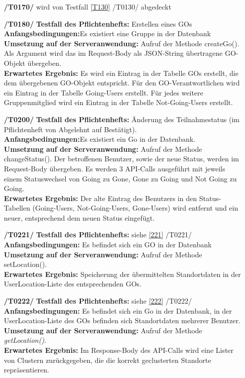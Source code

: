 \documentclass[11pt,a4paper]{scrartcl}
\begin{document}
\begin{enumerate}
	\item[\textbf{/T0170/}] wird von Testfall \ref{T130} /T0130/ abgedeckt
	
	\item[\textbf{/T0180/}]
	\textbf{Testfall des Pflichtenhefts: }Erstellen eines GOs\\
	\textbf{Anfangsbedingungen:}Es existiert eine Gruppe in der Datenbank\\
	\textbf{Umsetzung auf der Serveranwendung: }Aufruf der Methode createGo(). Als Argument wird das im Request-Body als JSON-String übertragene GO-Objekt übergeben.\\
	\textbf{Erwartetes Ergebnis: }Es wird ein Eintrag in der Tabelle GOs erstellt, die dem übergebenen GO-Objekt entspricht. Für den GO-Verantwortlichen wird ein Eintrag in der Tabelle Going-Users erstellt. Für jedes weitere Gruppenmitglied wird ein Eintrag in der Tabelle Not-Going-Users erstellt.
	
	\item[\textbf{/T0200/}]
	\textbf{Testfall des Pflichtenhefts: }Änderung des Teilnahmestatus (im Pflichtenheft von Abgelehnt auf Bestätigt).\\
	\textbf{Anfangsbedingungen:}Es existiert ein Go in der Datenbank.\\
	\textbf{Umsetzung auf der Serveranwendung: }Aufruf der Methode changeStatus(). Der betroffenen Benutzer, sowie der neue Status, werden im Request-Body übergeben. Es werden 3 API-Calls ausgeführt mit jeweils einem Statuswechsel von Going zu Gone, Gone zu Going und Not Going zu Going.\\
	\textbf{Erwartetes Ergebnis: }Der alte Eintrag des Benutzers in den Status-Tabellen (Going-Users, Not-Going-Users, Gone-Users) wird entfernt und ein neuer, entsprechend dem neuen Status eingefügt.
	
	\item[\textbf{/T0221/}]
	\textbf{Testfall des Pflichtenhefts: }siehe \ref{221} /T0221/\\
	\textbf{Anfangsbedingungen: }Es befindet sich ein GO in der Datenbank\\
	\textbf{Umsetzung auf der Serveranwendung: }Aufruf der Methode setLocation().\\
	\textbf{Erwartetes Ergebnis: }Speicherung der übermittelten Standortdaten in der UserLocation-Liste des entsprechenden GOs.
	
	\item[\textbf{/T0222/}]
	\textbf{Testfall des Pflichtenhefts: }siehe \ref{222} /T0222/\\
	\textbf{Anfangsbedingungen: }Es befindet sich ein Go in der Datenbank, in der UserLocation-Liste des GOs befinden sich Standortdaten mehrerer Benutzer.\\
	\textbf{Umsetzung auf der Serveranwendung: }Aufruf der Methode \textit{getLocation()}.\\
	\textbf{Erwartetes Ergebnis: }Im Response-Body des API-Calls wird eine Lister von Clustern zurückgegeben, die die korrekt geclusterten Standorte repräsentieren.
	

\end{enumerate}
\end{document}
